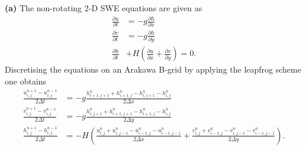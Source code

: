 \textbf{(a)} The non-rotating 2-D SWE equations are given as 
\begin{subequations}
\begin{align}
\frac{\partial u}{\partial t}& = -g \frac{\partial h}{\partial x} \\
\frac{\partial v}{\partial t}& = -g \frac{\partial h}{\partial y} \\
\frac{\partial h}{\partial t}& + H \left( \frac{\partial u}{\partial x} + \frac{\partial v}{\partial y} \right) = 0.
\end{align}
\label{eq:SWE}
\end{subequations}
Discretising the equations on an Arakawa B-grid by applying the leapfrog scheme one obtains
\begin{subequations}
\begin{align}
\frac{u_{i,j}^{n+1} - u_{i,j}^{n-1}}{2\Delta t} &= -g \frac{h_{i+1,j+1}^{n} + h_{i+1,j}^{n}-h_{i,j+1}^{n}-h_{i,j}^{n}}{2\Delta x} \\
\frac{v_{i,j}^{n+1} - v_{i,j}^{n-1}}{2\Delta t} &= -g \frac{h_{i,j+1}^{n} + h_{i+1,j+1}^{n}-h_{i+1,j}^{n}-h_{i,j}^{n}}{2\Delta y}
\\
\frac{h_{i,j}^{n+1} - h_{i,j}^{n-1}}{2\Delta t}& = - H \left( \frac{u_{i,j}^{n} + u_{i,j-1}^{n}-u_{i-1,j}^{n}-u_{i-1,j-1}^{n}}{2\Delta x} + \frac{v_{i,j}^{n} + v_{i-1,j}^{n}-v_{i,j-1}^{n}-v_{i-1,j-1}^{n}}{2\Delta y} \right).
\end{align}
\label{eq:discretised_SWE}
\end{subequations}

